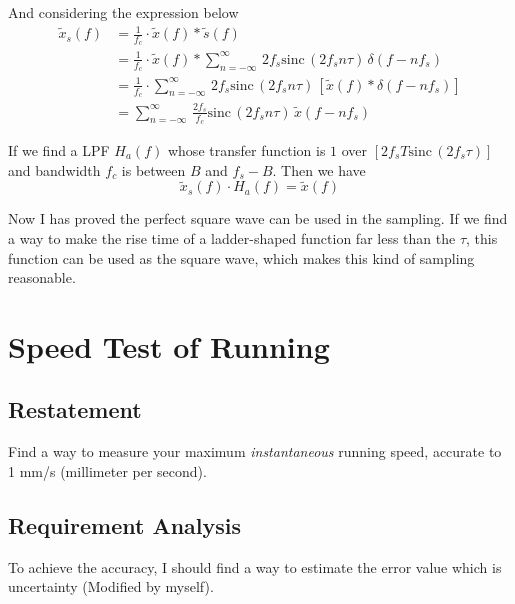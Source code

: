\documentclass{article}
\begin{document}
And considering the expression below
\begin{equation}
    \begin{aligned}
        \widetilde{x}_s(f) & = \frac{1}{f_c} \cdot \widetilde{x}(f) * \widetilde{s}(f)                  \\
                           & = \frac{1}{f_c}\cdot \widetilde{x}(f) * \sum_{n = -\infty}^{\infty}\, 2f_s \mathrm{sinc}\,
                             ( 2f_s n\tau)\, \delta(f - nf_s)  \\
                           & = \frac{1}{f_c} \cdot \sum_{n = -\infty}^{\infty}\, 2f_s \mathrm{sinc}\, ( 2f_s
                             n\tau)\, \left[ \widetilde{x}(f) *\delta(f - nf_s) \right] \\
                           & = \sum_{n = -\infty}^{\infty}\,\frac{2f_s}{f_c} \mathrm{sinc}\, ( 2f_s n\tau)\, \widetilde
                             {x}(f - nf_s)
    \end{aligned}
\end{equation}

If we find a LPF $H_a(f)$ whose transfer function is $1$ over $[2f_s T \mathrm{sinc}\, ( 2f_s\tau)]$ and bandwidth $f_c$
is between $B$ and $f_s - B$. Then we have
\begin{equation}
    \widetilde{x}_s(f) \cdot H_a(f) = \widetilde{x}(f)
\end{equation}

Now I has proved the perfect square wave can be used in the sampling. If we find a way to make the rise time of a
ladder-shaped function far less than the $\tau$, this function can be used as the square wave, which makes this kind of
sampling reasonable.


\section{Speed Test of Running}

\subsection{Restatement} Find a way to measure your maximum \emph{instantaneous} running speed, accurate to 1 mm/s
 (millimeter per second).

\subsection{Requirement Analysis}
\label{prepare} To achieve the accuracy, I should find a way to estimate the error value which is uncertainty
 (Modified by myself).
\end{document}

